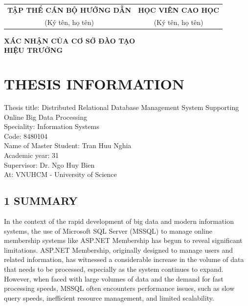 \documentclass[50pt]{extarticle}
\begin{document}
\begin{center}
    \begin{tabular}{c c}
        \textbf{TẬP THỂ CÁN BỘ HƯỚNG DẪN} & \textbf{HỌC VIÊN CAO HỌC} \\
        (Ký tên, họ tên) & (Ký tên, họ tên) \\
    \end{tabular}
    
    \vspace{3cm} %
    
    \textbf{XÁC NHẬN CỦA CƠ SỞ ĐÀO TẠO} \\
    \textbf{HIỆU TRƯỞNG}
\end{center}

\pagebreak
{}
{}
\section*{\centering \MakeUppercase{THESIS INFORMATION}}

Thesis title: Distributed Relational Database Management System
Supporting Online Big Data Processing\\
Speciality: Information Systems\\
Code: 8480104\\
Name of Master Student: Tran Huu Nghia\\
Academic year: 31\\
Supervisor: Dr. Ngo Huy Bien\\
At: VNUHCM - University of Science



\subsection*{1 SUMMARY}
In the context of the rapid development of big data and modern information systems, the use of Microsoft SQL Server (MSSQL) to manage online membership systems like ASP.NET Membership has begun to reveal significant limitations. ASP.NET Membership, originally designed to manage users and related information, has witnessed a considerable increase in the volume of data that needs to be processed, especially as the system continues to expand. However, when faced with large volumes of data and the demand for fast processing speeds, MSSQL often encounters performance issues, such as slow query speeds, inefficient resource management, and limited scalability.
\end{document}
